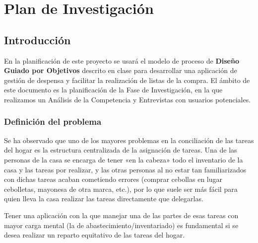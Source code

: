 \chapter{Plan de Investigación}

\section{Introducción}
En la planificación de este proyecto se usará el modelo de proceso de \textbf{Diseño Guiado por Objetivos} descrito en clase para desarrollar una aplicación de gestión de despensa y facilitar la realización de listas de la compra. El ámbito de este documento es la planificación de la Fase de Investigación, en la que realizamos un Análisis de la Competencia y Entrevistas con usuarios potenciales.

\subsection{Definición del problema}
Se ha observado que uno de los mayores problemas en la conciliación de las tareas del hogar es la estructura centralizada de la asignación de tareas. Una de las personas de la casa se encarga de tener «en la cabeza» todo el inventario de la casa y las tareas por realizar, y las otras personas al no estar tan familiarizados con dichas tareas acaban cometiendo errores (comprar cebollas en lugar cebolletas, mayonesa de otra marca, etc.), por lo que suele ser más fácil para quien lleva la casa realizar las tareas directamente que delegarlas.

Tener una aplicación con la que manejar una de las partes de esas tareas con mayor carga mental (la de abastecimiento/inventariado) es fundamental si se desea realizar un reparto equitativo de las tareas del hogar.

